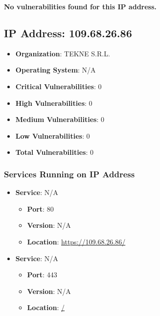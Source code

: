 \documentclass{article}
\begin{document}
\textbf{No vulnerabilities found for this IP address.}




\clearpage



\subsection{IP Address: 109.68.26.86}

\begin{itemize}
    \item \textbf{Organization}: TEKNE S.R.L.
    \item \textbf{Operating System}:  N/A 
    \item \textbf{Critical Vulnerabilities}: 0
    \item \textbf{High Vulnerabilities}: 0
    \item \textbf{Medium Vulnerabilities}: 0
    \item \textbf{Low Vulnerabilities}: 0
    \item \textbf{Total Vulnerabilities}: 0
\end{itemize}

\subsubsection*{Services Running on IP Address}

\begin{itemize}
    
        \item \textbf{Service}: N/A
        \begin{itemize}
            \item \textbf{Port}: 80
            \item \textbf{Version}:  N/A 
            \item \textbf{Location}: \href{ https://109.68.26.86/ }{ https://109.68.26.86/ }
        \end{itemize}
    
        \item \textbf{Service}: N/A
        \begin{itemize}
            \item \textbf{Port}: 443
            \item \textbf{Version}:  N/A 
            \item \textbf{Location}: \href{ / }{ / }
        \end{itemize}
    
\end{itemize}
\end{document}
